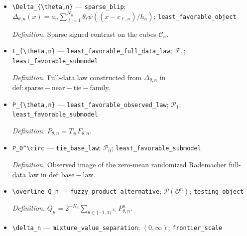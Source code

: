 \documentclass{article}
\begin{document}
\begin{itemize}
  \par\smallskip\noindent\emph{Definition.} \texttt{Rademacher sign vector indexing a sparse near-\allowbreak{}tie law.}
  \item \texttt{\textbackslash{}\allowbreak{}Delta\_\allowbreak{}\{\textbackslash{}\allowbreak{}theta,\allowbreak{}n\}\allowbreak{}} --- \texttt{sparse\_\allowbreak{}blip}; \(\Delta_{\theta,n}(x)=a_n\sum_{\ell=1}^{N_n}\theta_\ell\psi((x-c_{\ell,n})/h_n)\); \texttt{least\_\allowbreak{}favorable\_\allowbreak{}object}
  \par\smallskip\noindent\emph{Definition.} Sparse signed contrast on the cubes \(\mathcal C_n\).
  \item \texttt{F\_\allowbreak{}\{\textbackslash{}\allowbreak{}theta,\allowbreak{}n\}\allowbreak{}} --- \texttt{least\_\allowbreak{}favorable\_\allowbreak{}full\_\allowbreak{}data\_\allowbreak{}law}; \(\mathcal F_1\); \texttt{least\_\allowbreak{}favorable\_\allowbreak{}submodel}
  \par\smallskip\noindent\emph{Definition.} Full-data law constructed from \(\Delta_{\theta,n}\) in \(\mathrm{def:sparse-near-tie-family}\).
  \item \texttt{P\_\allowbreak{}\{\textbackslash{}\allowbreak{}theta,\allowbreak{}n\}\allowbreak{}} --- \texttt{least\_\allowbreak{}favorable\_\allowbreak{}observed\_\allowbreak{}law}; \(\mathcal P_1\); \texttt{least\_\allowbreak{}favorable\_\allowbreak{}submodel}
  \par\smallskip\noindent\emph{Definition.} \(P_{\theta,n}=T_\#F_{\theta,n}\).
  \item \texttt{P\_\allowbreak{}0\textasciicircum{}\textbackslash{}\allowbreak{}circ} --- \texttt{tie\_\allowbreak{}base\_\allowbreak{}law}; \(\mathcal P_0\); \texttt{least\_\allowbreak{}favorable\_\allowbreak{}submodel}
  \par\smallskip\noindent\emph{Definition.} Observed image of the zero-mean randomized Rademacher full-data law in \(\mathrm{def:base-law}\).
  \item \texttt{\textbackslash{}\allowbreak{}overline Q\_\allowbreak{}n} --- \texttt{fuzzy\_\allowbreak{}product\_\allowbreak{}alternative}; \(\mathcal P(\mathcal O^n)\); \texttt{testing\_\allowbreak{}object}
  \par\smallskip\noindent\emph{Definition.} \(\overline Q_n=2^{-N_n}\sum_{\theta\in\{-1,1\}^{N_n}}P_{\theta,n}^n\).
  \item \texttt{\textbackslash{}\allowbreak{}delta\_\allowbreak{}n} --- \texttt{mixture\_\allowbreak{}value\_\allowbreak{}separation}; \((0,\infty)\); \texttt{frontier\_\allowbreak{}scale}

\end{itemize}
\end{document}

